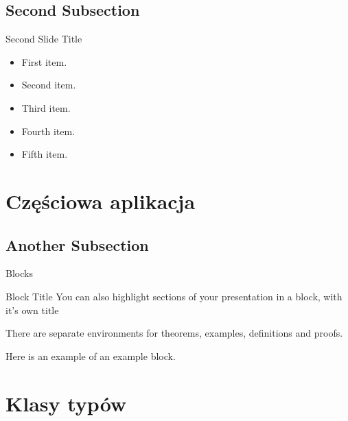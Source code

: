 \documentclass{beamer}
\begin{document}
\subsection{Second Subsection}

\begin{frame}{Second Slide Title}
  \begin{itemize}
  \item {
    First item.
    \pause %
  }
  \item {   
    Second item.
  }
  \item<3-> {
    Third item.
  }
  \item<4-> {
    Fourth item.
  }
  \item<5-> {
    Fifth item. 
  }
  \end{itemize}
\end{frame}

\section{Częściowa aplikacja}

\subsection{Another Subsection}

\begin{frame}{Blocks}
\begin{block}{Block Title}
You can also highlight sections of your presentation in a block, with it's own title
\end{block}
\begin{theorem}
There are separate environments for theorems, examples, definitions and proofs.
\end{theorem}
\begin{example}
Here is an example of an example block.
\end{example}
\end{frame}

\section{Klasy typów}
\end{document}
